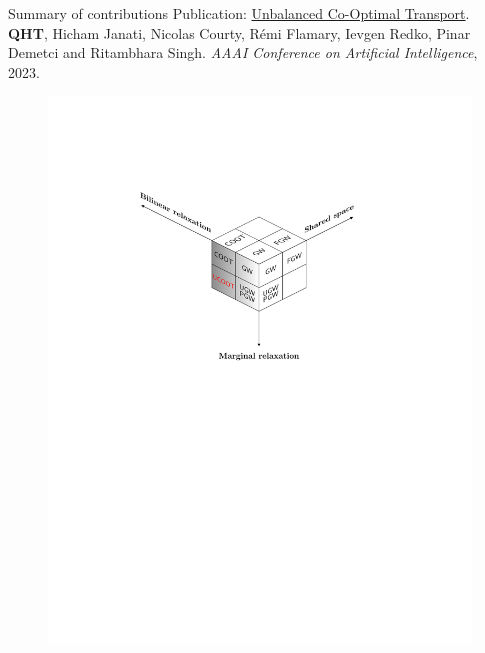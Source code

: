 \documentclass{beamer}
\begin{document}
\begin{frame}{Summary of contributions}
  \tiny
  Publication: \underline{Unbalanced Co-Optimal Transport}.
  \textbf{QHT}, Hicham Janati, Nicolas Courty, Rémi Flamary, Ievgen Redko, Pinar Demetci and Ritambhara Singh. \textit{AAAI Conference on Artificial Intelligence}, 2023.
  \vspace{-2.5cm}
  \begin{figure}
    \centering
    \includegraphics[width=1.1\linewidth, keepaspectratio=true]{OT_new/cube_ucoot.pdf}
  \end{figure}
\end{frame}
\end{document}
